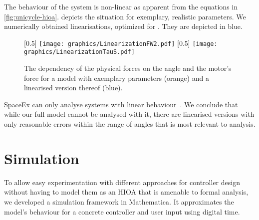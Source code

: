 \documentclass[copyright,submission]{eptcs}
\begin{document}
The behaviour of the system is non-linear as apparent from the equations in \cref{fig:unicycle-hioa}.  depicts the situation for exemplary, realistic parameters. We numerically obtained linearisations, optimized for . They are depicted in blue.

\begin{figure}
    [0.5\linewidth]{
        \centering\texttt{[image: graphics/LinearizationFW2.pdf]}
    }[0.5\linewidth]{
        \centering\texttt{[image: graphics/LinearizationTauS.pdf]}
    }
    \caption{\label{fig:linearization} The dependency of the physical forces on the angle  and the motor's force  for a model with exemplary parameters (orange) and a linearised version thereof (blue).}
\end{figure}

SpaceEx can only analyse systems with linear behaviour~\cite{DBLP:conf/cav/FrehseGDCRLRGDM11}. We conclude that while our full model cannot be analysed with it, there are linearised versions with only reasonable errors within the range of angles  that is most relevant to analysis.


\section{Simulation}\label{sect:simulation}

To allow easy experimentation with different approaches for controller design without having to model them as an HIOA that is amenable to formal analysis, we developed a simulation framework in Mathematica. It approximates the model's behaviour for a concrete controller and user input using digital time.
\end{document}
